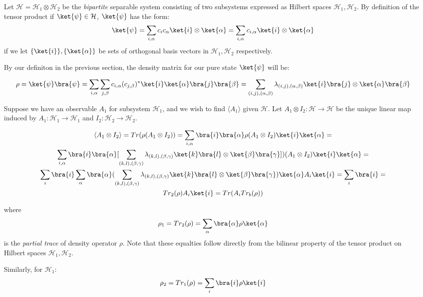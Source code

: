 Let $\mathcal{H} = \mathcal{H}_1 \otimes \mathcal{H}_2$ be the \textit{bipartite} separable system consisting of two subsystems expressed as Hilbert spaces $\mathcal{H}_1,\mathcal{H}_2$. By definition of the tensor product if $\ket{\psi} \in \mathcal{H}$, $\ket{\psi}$ has the form:
$$ \ket{\psi} = \sum_{i,\alpha} c_{i}c_{\alpha} \ket{i}\otimes\ket{\alpha} =  \sum_{i,\alpha} c_{i,\alpha} \ket{i}\otimes\ket{\alpha}$$
if we let $\{\ket{i}\},\{\ket{\alpha}\}$ be sets of orthogonal basis vectors in $\mathcal{H}_1,\mathcal{H}_2$ respectively.

By our definiton in the previous section, the density matrix for our pure state $\ket{\psi}$ will be:

$$ \rho = \ket{\psi}\bra{\psi} = \sum_{i,\alpha}\sum_{j,\beta} c_{i,\alpha}(c_{j,\beta})^*\ket{i}\ket{\alpha}\bra{j}\bra{\beta} = \sum_{(i,j),(\alpha,\beta)} \lambda_{(i,j),(\alpha,\beta)} \ket{i}\bra{j}\otimes \ket{\alpha}\bra{\beta}$$

Suppose we have an observable $A_1$ for subsystem $\mathcal{H}_1$, and we wish to find $\langle A_1 \rangle$ given $\mathcal{H}$. Let $A_1 \otimes I_2: \mathcal{H} \rightarrow \mathcal{H}$ be the unique linear map induced by $A_1:\mathcal{H}_1 \rightarrow \mathcal{H}_1$ and $I_2: \mathcal{H}_2 \rightarrow \mathcal{H}_2$.

\begin{gather}
  \langle A_1 \otimes I_2 \rangle = Tr(\rho(A_1 \otimes I_2)) = \sum_{i,\alpha} \bra{i}\bra{\alpha}\rho(A_1 \otimes I_2) \ket{i}\ket{\alpha} = \\
  \sum_{i,\alpha} \bra{i}\bra{\alpha}[
  \sum_{(k,l),(\beta,\gamma)} \lambda_{(k,l),(\beta,\gamma)} \ket{k}\bra{l}\otimes \ket{\beta}\bra{\gamma}]
  )(A_1 \otimes I_2)\ket{i}\ket{\alpha} = \\
  \sum_{i} \bra{i} \sum_{\alpha} \bra{\alpha}(\sum_{(k,l),(\beta,\gamma)}
   \lambda_{(k,l),(\beta,\gamma)} \ket{k}\bra{l}\otimes \ket{\beta}\bra{\gamma})\ket{\alpha} A_i \ket{i} = \sum_{i} \bra{i} = \\ Tr_2(\rho)A_i \ket{i} = Tr(A_iTr_b(\rho))
\end{gather}

where $$ \rho_1= Tr_2(\rho) = \sum_{\alpha} \bra{\alpha} \rho \ket{\alpha} $$ is the \textit{partial trace} of density operator $\rho$. Note that these equalties follow directly from the bilinear property of the tensor product on Hilbert spaces $\mathcal{H}_1,\mathcal{H}_2$.

Similarly, for $\mathcal{H}_1$:
$$\rho_2 = Tr_1(\rho) = \sum_{i} \bra{i}\rho\ket{i} $$

